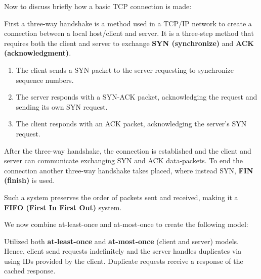 \noindent
Now to discuss briefly how a basic TCP connection is made:
\begin{Def}

    First a three-way handshake is a method used in a TCP/IP network to create a connection between a local host/client and server. 
    It is a three-step method that requires both the client and server to exchange \textbf{SYN (synchronize)}
     and \textbf{ACK (acknowledgment)}.
     \begin{enumerate}
        \item The client sends a SYN packet to the server requesting to synchronize sequence numbers.
        \item The server responds with a SYN-ACK packet, acknowledging the request and sending its own SYN request.
        \item The client responds with an ACK packet, acknowledging the server's SYN request.
     \end{enumerate}
    
    \noindent
    After the three-way handshake, the connection is established and the client and server can communicate exchanging SYN and ACK data-packets.
    To end the connection another three-way handshake takes placed, where instead SYN, \textbf{FIN (finish)} is used.

    Such a system preserves the order of packets sent and received, making it a \textbf{FIFO (First In First Out)} system.
\end{Def}

\noindent
We now combine at-least-once and at-most-once to create the following model:

\begin{Def}

    Utilized both \textbf{at-least-once} and \textbf{at-most-once} (client and server) models. Hence, client send requests indefinitely and 
    the server handles duplicates via using IDs provided by the client. Duplicate requests 
    receive a response of the cached response.
\end{Def}

